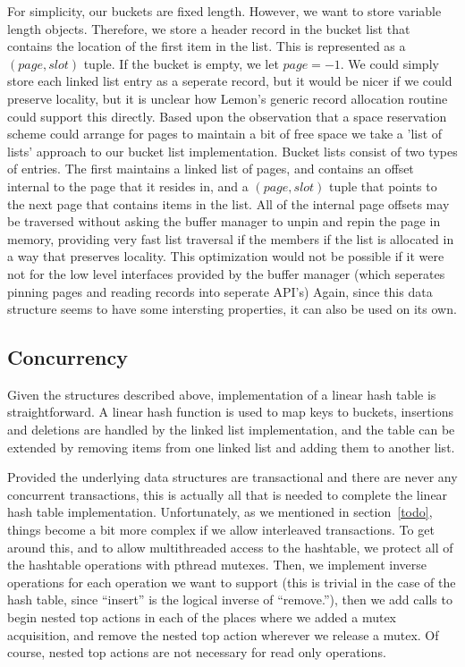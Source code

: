\documentclass[letterpaper,twocolumn,english]{article}
\newcommand{\yad}{Lemon\xspace}
\begin{document}
For simplicity, our buckets are fixed length.  However, we want to
store variable length objects.  Therefore, we store a header record in
the bucket list that contains the location of the first item in the
list.  This is represented as a $(page,slot)$ tuple.  If the bucket is
empty, we let $page=-1$.  We could simply store each linked list entry
as a seperate record, but it would be nicer if we could preserve
locality, but it is unclear how \yad's generic record allocation
routine could support this directly.  Based upon the observation that
a space reservation scheme could arrange for pages to maintain a bit
of free space we take a 'list of lists' approach to our bucket list
implementation.  Bucket lists consist of two types of entries.  The
first maintains a linked list of pages, and contains an offset
internal to the page that it resides in, and a $(page,slot)$ tuple
that points to the next page that contains items in the list.  All of
the internal page offsets may be traversed without asking the buffer
manager to unpin and repin the page in memory, providing very fast
list traversal if the members if the list is allocated in a way that
preserves locality.  This optimization would not be possible if it
were not for the low level interfaces provided by the buffer manager
(which seperates pinning pages and reading records into seperate
API's)  Again, since this data structure seems to have some intersting 
properties, it can also be used on its own.

\subsection{Concurrency}

Given the structures described above, implementation of a linear hash
table is straightforward.  A linear hash function is used to map keys
to buckets, insertions and deletions are handled by the linked list
implementation, and the table can be extended by removing items from
one linked list and adding them to another list.

Provided the underlying data structures are transactional and there
are never any concurrent transactions, this is actually all that is
needed to complete the linear hash table implementation.
Unfortunately, as we mentioned in section~\ref{todo}, things become a
bit more complex if we allow interleaved transactions.  To get around
this, and to allow multithreaded access to the hashtable, we protect
all of the hashtable operations with pthread mutexes.  Then, we
implement inverse operations for each operation we want to support
(this is trivial in the case of the hash table, since ``insert'' is
the logical inverse of ``remove.''), then we add calls to begin nested
top actions in each of the places where we added a mutex acquisition,
and remove the nested top action wherever we release a mutex.  Of
course, nested top actions are not necessary for read only operations.
\end{document}

